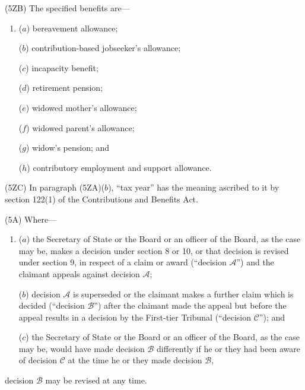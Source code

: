 \documentclass[12pt,a4paper]{article}
\begin{document}
(5ZB) The specified benefits are—
\begin{enumerate}\item[]
($a$) bereavement allowance;

($b$) contribution-based jobseeker’s allowance;

($c$) incapacity benefit;

($d$) retirement pension;

($e$) widowed mother’s allowance;

($f$) widowed parent’s allowance; 

($g$) widow’s pension;
% 
and

($h$) contributory employment and support allowance.
\end{enumerate}

(5ZC) In paragraph (5ZA)($b$), “tax year” has the meaning ascribed to it by section 122(1) of the Contributions and Benefits Act.

(5A) Where—
\begin{enumerate}\item[]
($a$) the Secretary of State or the Board or an officer of the Board, as the case may be, makes a decision under section 8 or 10, or that decision is revised under section 9, in respect of a claim or award (“decision $\mathcal{A}$”) and the claimant appeals against decision $\mathcal{A}$;

($b$) decision $\mathcal{A}$ is superseded or the claimant makes a further claim which is decided (“decision $\mathcal{B}$”) after the claimant made the appeal but before the appeal results in a decision by 
the First-tier Tribunal  %
(“decision $\mathcal{C}$”); and

($c$) the Secretary of State or the Board or an officer of the Board, as the case may be, would have made decision $\mathcal{B}$ differently if he or they had been aware of decision $\mathcal{C}$ at the time he or they made decision $\mathcal{B}$,
\end{enumerate}
decision $\mathcal{B}$ may be revised at any time.
\end{document}
